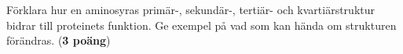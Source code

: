 \documentclass{exam}
\begin{document}
\begin{questions}
\break
\question
Förklara hur en aminosyras primär-, sekundär-, tertiär- och kvartiärstruktur bidrar till proteinets funktion. Ge exempel på vad som kan hända om strukturen förändras. (\textbf{3 poäng})
\vspace{60mm}

\end{questions}
\end{document}

